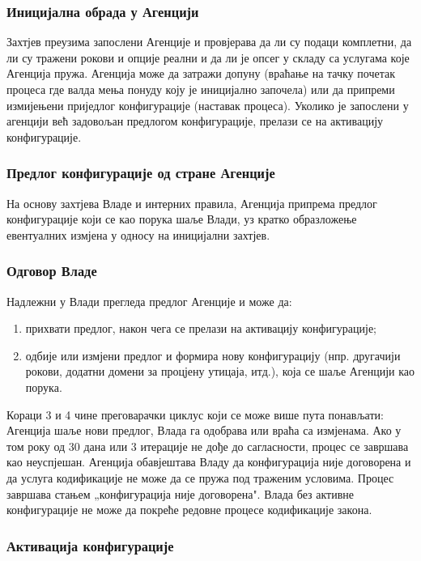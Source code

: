 \documentclass[12pt,a4paper]{article}
\begin{document}
\subsubsection{Иницијална обрада у Агенцији}

Захтјев преузима запослени Агенције и провјерава да ли су подаци комплетни, да ли су тражени рокови и опције реални и да ли је опсег у складу са услугама које Агенција пружа. Агенција може да затражи допуну (враћање на тачку почетак процеса где валда мења понуду коју је иницијално започела) или да припреми измијењени приједлог конфигурације (наставак процеса). Уколико је запослени у агенцији већ задовољан предлогом конфигурације, прелази се на активацију конфигурације.

\subsubsection{Предлог конфигурације од стране Агенције}

На основу захтјева Владе и интерних правила, Агенција припрема предлог конфигурације који се као порука шаље Влади, уз кратко образложење евентуалних измјена у односу на иницијални захтјев.

\subsubsection{Одговор Владе}

Надлежни у Влади прегледа предлог Агенције и може да:
\begin{enumerate}[label=\alph*)]
    \item прихвати предлог, након чега се прелази на активацију конфигурације;
    \item одбије или измјени предлог и формира нову конфигурацију (нпр. другачији рокови, додатни домени за процјену утицаја, итд.), која се шаље Агенцији као порука.
\end{enumerate}

Кораци 3 и 4 чине преговарачки циклус који се може више пута понављати: Агенција шаље нови предлог, Влада га одобрава или враћа са измјенама. Ако у том року од 30 дана или 3 итерације не дође до сагласности, процес се завршава као неуспјешан. Агенција обавјештава Владу да конфигурација није договорена и да услуга кодификације не може да се пружа под траженим условима. Процес завршава стањем „конфигурација није договорена". Влада без активне конфигурације не може да покреће редовне процесе кодификације закона.

\subsubsection{Активација конфигурације}
\end{document}
